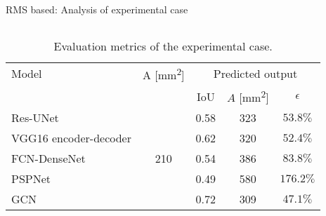 \documentclass[10pt,aspectratio=169,dvipsnames]{beamer} %
\begin{document}
	\begin{frame}{RMS based: Analysis of experimental case}
		\begin{columns}[T]
			\begin{column}[t]{0.9\textwidth}
				\centering
				\begin{table}[!ht]
					\centering
					\caption{Evaluation metrics of the experimental case.}
					\label{tab:rms_exp_case_}
					\begin{tabular}{l@{\ }cccc}
						\toprule
						\multicolumn{1}{l}{Model} & \multicolumn{1}{c}{A [mm\textsuperscript{2}]} & \multicolumn{3}{c}{Predicted output} \\ 
						\cmidrule(lr){3-5} & & \multicolumn{1}{c}{IoU} & \multicolumn{1}{c}{\(\hat{A}\) [mm\textsuperscript{2}]} & \(\epsilon\) \\ \midrule
						Res-UNet & \multicolumn{1}{c}{\multirow{5}{*}{210}} & \multicolumn{1}{c}{0.58} & \multicolumn{1}{c}{323}  & \(53.8\%\) \\ 
						VGG16 encoder-decoder &  & \multicolumn{1}{c}{0.62} & \multicolumn{1}{c}{320} & \(52.4\%\) 
						\\ 
						FCN-DenseNet &  & \multicolumn{1}{c}{0.54} & \multicolumn{1}{c}{386} & \(83.8\%\) \\ 
						PSPNet &  & \multicolumn{1}{c}{0.49} & \multicolumn{1}{c}{580} & \(176.2\%\) 
						\\ 
						GCN &  & \multicolumn{1}{c}{0.72} & \multicolumn{1}{c}{309} & \(47.1\%\) 
						\\ 
						\bottomrule
					\end{tabular}		
				\end{table}			
			\end{column}
		\end{columns}			
	\end{frame}
\end{document}
